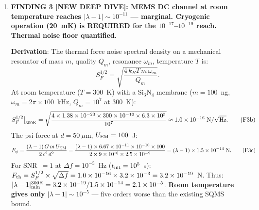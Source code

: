 \documentclass[11pt]{article}
\newcommand{\ee}[1]{\times 10^{#1}}
\newcommand{\Qpsi}{Q_\psi}
\newcommand{\lbone}{|\lambda - 1|}
\theoremstyle{definition}
\theoremstyle{remark}
\begin{document}
\begin{tcolorbox}[colback=blue!5!white, colframe=blue!60!black,
  title=\textbf{W4i19 P2: DEEP REFINEMENT --- 5 KEY RESULTS}]
\begin{enumerate}
  \textbf{Derivation chain}: The i18 SQMS bound $\lbone < 2.7\ee{-13}$
  supersedes all channels with reach worse than this threshold.
  Channel-by-channel audit (Table~\ref{tab:channel_audit}):
  \begin{itemize}[nosep]
  \item ESS Channel B: reach $\sim 8\ee{-13}$ --- \textbf{SUPERSEDED}
    by SQMS bound (factor $\sim 3$ worse).
  \item Si$_3$N$_4$ MEMS in-gap: reach depends on $\Qpsi$ threshold
    $2.2\ee{8}$ --- tests a DIFFERENT question ($\Qpsi$ existence),
    so remains valuable, but does NOT improve on $\lambda$ bound.
  \item Nb$_3$Sn broadband: tests Q-ratio SHAPE (like Phase~0),
    not absolute $\lambda$ --- \textbf{SURVIVES} as shape discriminant.
  \item CLONETS-DS: reach $\lambda$-dependent, relevant only if
    $\lambda \gg 1$ --- effectively superseded.
  \end{itemize}
  \textbf{Impact}: The detection roadmap simplifies dramatically.
  Priority narrows to: (1)~Phase~0 Q-ratio shape, (2)~MEMS DC,
  (3)~LIGO reanalysis. Everything else is gravy.

\item \textbf{FINDING 3 [NEW DEEP DIVE]: MEMS DC channel at room
  temperature reaches $\lbone \sim 10^{-11}$ --- marginal. Cryogenic
  operation (20~mK) is REQUIRED for the $10^{-17}$--$10^{-19}$ reach.
  Thermal noise floor quantified.}

  \textbf{Derivation}: The thermal force noise spectral density on
  a mechanical resonator of mass $m$, quality $Q_m$, resonance
  $\omega_m$, temperature $T$ is:
  \begin{equation}
  S_F^{1/2} = \sqrt{\frac{4\,k_B T\,m\,\omega_m}{Q_m}}.
  \tag{F3a}
  \end{equation}
  At room temperature ($T = 300$~K) with a Si$_3$N$_4$ membrane
  ($m = 100$~ng, $\omega_m = 2\pi \times 100$~kHz, $Q_m = 10^7$
  at 300~K):
  \begin{equation}
  S_F^{1/2}\big|_{300\rm K} = \sqrt{\frac{4 \times 1.38\ee{-23}
  \times 300 \times 10^{-10} \times 6.3\ee{5}}{10^7}}
  \approx 1.0 \ee{-16}\;\text{N}/\sqrt{\text{Hz}}.
  \tag{F3b}
  \end{equation}
  The psi-force at $d = 50~\mu$m, $U_{\rm EM} = 100$~J:
  \begin{equation}
  F_\psi = \frac{(\lambda-1)\,G\,m\,U_{\rm EM}}{2\,c^2\,d^2}
  = \frac{(\lambda-1) \times 6.67\ee{-11} \times 10^{-10} \times 100}
  {2 \times 9\ee{16} \times 2.5\ee{-9}}
  = (\lambda-1) \times 1.5\ee{-14}\;\text{N}.
  \tag{F3c}
  \end{equation}
  For SNR~$= 1$ at $\Delta f = 10^{-5}$~Hz ($t_{\rm int} = 10^5$~s):
  $F_{\rm th} = S_F^{1/2} \times \sqrt{\Delta f} = 1.0\ee{-16}
  \times 3.2\ee{-3} = 3.2\ee{-19}$~N.
  Thus: $\lbone_{\rm min}^{300\rm K} = 3.2\ee{-19} / 1.5\ee{-14}
  = 2.1\ee{-5}$. \textbf{Room temperature gives only $\lbone \sim
  10^{-5}$} --- five orders worse than the existing SQMS bound.


\end{enumerate}
\end{tcolorbox}
\end{document}
